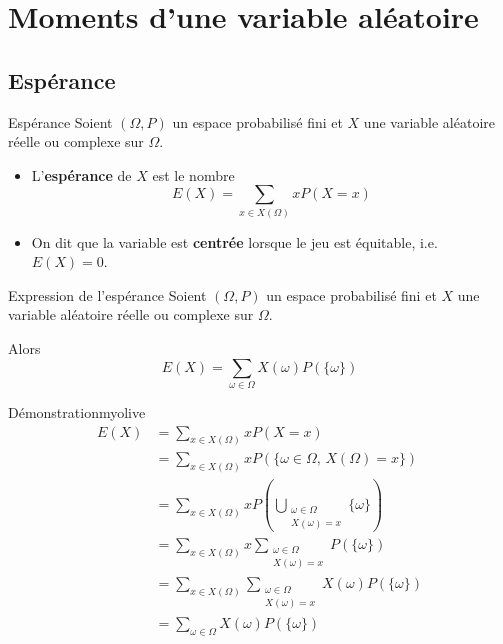 \section{Moments d’une variable aléatoire}

\subsection{Espérance}

    \begin{defi}{Espérance}{}
        Soient $(\Omega,P)$ un espace probabilisé fini et $X$ une variable aléatoire réelle ou complexe sur $\Omega$.
        \begin{itemize}
            \item L’\textbf{espérance} de $X$ est le nombre \[ E(X) = \sum\limits_{x \in X(\Omega)} xP(X=x) \]
            \item On dit que la variable est \textbf{centrée} lorsque le jeu est équitable, i.e. $E(X) = 0$.
        \end{itemize}
    \end{defi}

    \begin{prop}{Expression de l’espérance}{}
        Soient $(\Omega,P)$ un espace probabilisé fini et $X$ une variable aléatoire réelle ou complexe sur $\Omega$.

        Alors 
        \[ E(X) = \sum\limits_{\omega \in \Omega} X(\omega) P(\{\omega\}) \]
    \end{prop}

    \begin{demo}{Démonstration}{myolive}
        \begin{align*}
            E(X) &= \sum\limits_{x \in X(\Omega)} xP(X=x) \\
            &= \sum\limits_{x \in X(\Omega)} xP(\{\omega \in \Omega, \, X(\Omega) = x \}) \\
            &= \sum\limits_{x \in X(\Omega)} xP(\bigcup\limits_{\substack{\omega \in \Omega \\ X(\omega) = x}} \{ \omega \}) \\
            &= \sum\limits_{x \in X(\Omega)}x \sum\limits_{\substack{\omega \in \Omega \\ X(\omega) = x}} P(\{\omega\}) \\
            &= \sum\limits_{x \in X(\Omega)} \sum\limits_{\substack{\omega \in \Omega \\ X(\omega) = x}} X(\omega) P(\{\omega\}) \\
            &= \sum\limits_{\omega \in \Omega} X(\omega) P(\{\omega\})
        \end{align*}
    \end{demo}

